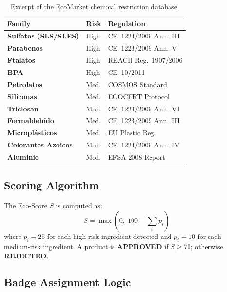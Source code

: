 \documentclass[10pt,a4paper,twocolumn]{article}
\begin{document}
\begin{table}[H]
\centering
\caption{Excerpt of the EcoMarket chemical restriction database.}
\label{tab:chemicals}
\renewcommand{\arraystretch}{1.1}
\scriptsize
\begin{tabularx}{\columnwidth}{>{\bfseries}l l l}
\toprule
Family & Risk & Regulation \\
\midrule
\rowcolor{red!8}   Sulfatos (SLS/SLES) & High & CE~1223/2009 Ann.~III \\
\rowcolor{red!8}   Parabenos           & High & CE~1223/2009 Ann.~V  \\
\rowcolor{red!8}   Ftalatos            & High & REACH Reg.~1907/2006  \\
\rowcolor{red!8}   BPA                 & High & CE~10/2011            \\
\rowcolor{orange!8}Petrolatos          & Med. & COSMOS Standard       \\
\rowcolor{orange!8}Siliconas           & Med. & ECOCERT Protocol      \\
\rowcolor{orange!8}Triclosan           & Med. & CE~1223/2009 Ann.~VI  \\
\rowcolor{orange!8}Formaldehído        & Med. & CE~1223/2009 Ann.~III \\
\rowcolor{orange!8}Microplásticos      & Med. & EU Plastic Reg.       \\
\rowcolor{orange!8}Colorantes Azoicos  & Med. & CE~1223/2009 Ann.~IV  \\
\rowcolor{orange!8}Aluminio            & Med. & EFSA 2008 Report      \\
\bottomrule
\end{tabularx}
\end{table}

\subsection{Scoring Algorithm}

The Eco-Score $S$ is computed as:
\begin{equation}
  S = \max\!\left(0,\; 100 - \sum_{i} p_i\right)
\end{equation}
where $p_i = 25$ for each high-risk ingredient detected and
$p_i = 10$ for each medium-risk ingredient.
A product is \textbf{APPROVED} if $S \geq 70$; otherwise
\textbf{REJECTED}.

\subsection{Badge Assignment Logic}
\end{document}
